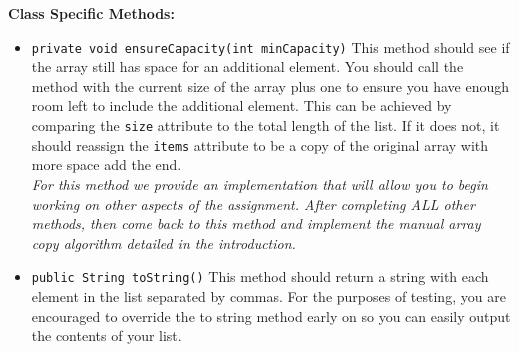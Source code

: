 \documentclass[a4paper]{article}
\begin{document}
\textbf{Class Specific Methods:}
\begin{itemize}
    \item \lstinline|private void ensureCapacity(int minCapacity)| This method should see if the array still has space for an additional element. You should call the method with the current size of the array plus one to ensure you have enough room left to include the additional element. This can be achieved by comparing the \lstinline|size| attribute to the total length of the list. If it does not, it should reassign the \lstinline|items| attribute to be a copy of the original array with more space add the end. \\ \textit{For this method we provide an implementation that will allow you to begin working on other aspects of the assignment. After completing ALL other methods, then come back to this method and implement the manual array copy algorithm detailed in the introduction.}
	\item \lstinline|public String toString()|  This method should return a string with each element in the list separated by commas. For the purposes of testing, you are encouraged to override the to string method early on so you can easily output the contents of your list. 
\end{itemize}
\end{document}
